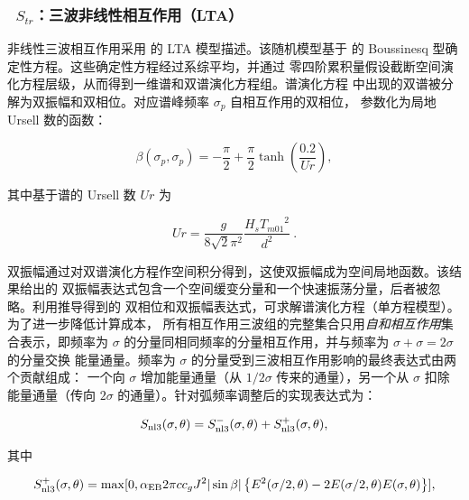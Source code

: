 \vsssub
\subsubsection{~$S_{tr}$：三波非线性相互作用（LTA）} \label{sec:TR1}
\vsssub


非线性三波相互作用采用 \cite{rep:Eld96} 的 LTA 模型描述。该随机模型基于
\cite{art:MS93} 的 Boussinesq 型确定性方程。这些确定性方程经过系综平均，并通过
零四阶累积量假设截断空间演化方程层级，从而得到一维谱和双谱演化方程组。谱演化方程
中出现的双谱被分解为双振幅和双相位。对应谱峰频率 $\sigma_p$ 自相互作用的双相位，
参数化为局地 Ursell 数的函数：

\begin{equation}
   \beta(\sigma_p,\sigma_p) = -\frac{\pi}{2} + \frac{\pi}{2}\tanh\left( \frac{0.2}{Ur} \right),
   \label{eq:biphase}
\end{equation}

\noindent
其中基于谱的 Ursell 数 $Ur$ 为

\begin{equation}
   Ur = \frac{g}{8\sqrt{2} \pi^2} \frac{H_s {T_{m01}}^2}{d^2}\  .
   \label{eq:ursell}
\end{equation}

双振幅通过对双谱演化方程作空间积分得到，这使双振幅成为空间局地函数。该结果给出的
双振幅表达式包含一个空间缓变分量和一个快速振荡分量，后者被忽略。利用推导得到的
双相位和双振幅表达式，可求解谱演化方程（单方程模型）。为了进一步降低计算成本，
所有相互作用三波组的完整集合只用\textit{自和相互作用}集合表示，即频率为 $\sigma$
的分量同相同频率的分量相互作用，并与频率为 $\sigma + \sigma = 2\sigma$ 的分量交换
能量通量。频率为 $\sigma$ 的分量受到三波相互作用影响的最终表达式由两个贡献组成：
一个向 $\sigma$ 增加能量通量（从 $1/2 \sigma$ 传来的通量），另一个从 $\sigma$
扣除能量通量（传向 $2 \sigma$ 的通量）。针对弧频率调整后的实现表达式为：

\begin{equation}
   S_{\rm nl3} (\sigma,\theta) = S^-_{\rm nl3} (\sigma,\theta) + S^+_{\rm nl3}
   (\sigma,\theta)  ,
   \label{eq:snl3}
\end{equation}

\noindent
其中

\begin{equation}
  S^+_{\rm nl3} (\sigma,\theta) = \max [0,\alpha_{\rm EB} 2 \pi c c_g J^2 |\sin\beta| \left \{ E^2(\sigma/2,\theta) -
  2 E(\sigma/2,\theta) E(\sigma,\theta) \right \}]  ,
  \label{eq:snl3plu}
\end{equation}

